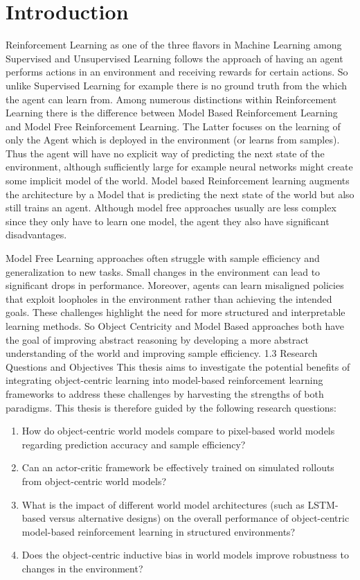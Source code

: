 \documentclass[
	english,
	ruledheaders=section,
	class=report,
	thesis={type=master},
	accentcolor=9c,
	custommargins=true,
	marginpar=false,
	parskip=half-,
	fontsize=11pt,
]{tudapub}
\begin{document}
\chapter{Introduction}
\label{chap:introduction}

Reinforcement Learning as one of the three flavors in Machine Learning among Supervised
and Unsupervised Learning follows the approach of having an agent
performs actions in an environment and receiving rewards
for certain actions. So unlike Supervised Learning for example there is no ground
truth from the which the agent can learn from. Among numerous distinctions
within Reinforcement Learning there is the difference
between Model Based Reinforcement Learning and Model Free Reinforcement Learning.
The Latter focuses on the learning of only the Agent which is deployed in
the environment (or learns from samples). Thus the agent
will have no explicit way of predicting the next state of the environment, although
sufficiently large for example neural networks might create some implicit
model of the world. Model based Reinforcement learning
augments the architecture by a Model that is predicting the next state of the world
but also still trains an agent. Although model free approaches usually are less complex
since they only have to learn one model, the agent they also have significant disadvantages.

Model Free Learning approaches often struggle with sample efficiency and generalization to new tasks. 
Small changes in the environment can lead to significant drops in performance.
Moreover, agents can learn misaligned policies that exploit loopholes in the environment rather than achieving 
the intended goals. These challenges highlight the need for more structured and interpretable learning methods. So Object Centricity and Model Based approaches
both have the goal of improving abstract reasoning by developing a more abstract understanding of the world and improving sample efficiency.
1.3 Research Questions and Objectives
This thesis aims to investigate the potential benefits
of integrating object-centric learning into model-based reinforcement learning frameworks to address these challenges by harvesting the
strengths of both paradigms. This thesis is therefore guided by the following research questions:
\begin{enumerate}
	\item How do object-centric world models compare to pixel-based world models regarding prediction accuracy and sample efficiency?
	\item Can an actor-critic framework be effectively trained on simulated rollouts from object-centric world models?
	\item What is the impact of different world model architectures (such as LSTM-based versus alternative designs) on the overall performance of object-centric model-based reinforcement learning in structured environments?
	\item Does the object-centric inductive bias in world models improve robustness to changes in the environment?
\end{enumerate}
\end{document}
